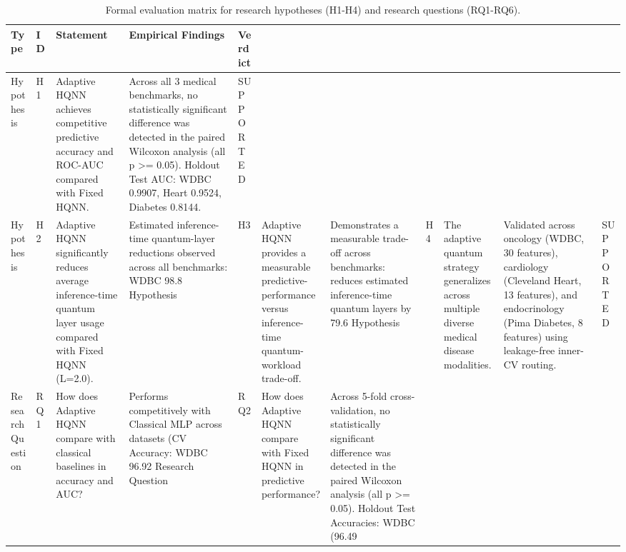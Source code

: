 \begin{table}
\caption{Formal evaluation matrix for research hypotheses (H1-H4) and research questions (RQ1-RQ6).}
\label{tab:hypotheses_summary}
\begin{tabular}{lllll}
\toprule
Type & ID & Statement & Empirical Findings & Verdict \\
\midrule
Hypothesis & H1 & Adaptive HQNN achieves competitive predictive accuracy and ROC-AUC compared with Fixed HQNN. & Across all 3 medical benchmarks, no statistically significant difference was detected in the paired Wilcoxon analysis (all p >= 0.05). Holdout Test AUC: WDBC 0.9907, Heart 0.9524, Diabetes 0.8144. & SUPPORTED \\
Hypothesis & H2 & Adaptive HQNN significantly reduces average inference-time quantum layer usage compared with Fixed HQNN (L=2.0). & Estimated inference-time quantum-layer reductions observed across all benchmarks: WDBC 98.8%
Hypothesis & H3 & Adaptive HQNN provides a measurable predictive-performance versus inference-time quantum-workload trade-off. & Demonstrates a measurable trade-off across benchmarks: reduces estimated inference-time quantum layers by 79.6%
Hypothesis & H4 & The adaptive quantum strategy generalizes across multiple diverse medical disease modalities. & Validated across oncology (WDBC, 30 features), cardiology (Cleveland Heart, 13 features), and endocrinology (Pima Diabetes, 8 features) using leakage-free inner-CV routing. & SUPPORTED \\
Research Question & RQ1 & How does Adaptive HQNN compare with classical baselines in accuracy and AUC? & Performs competitively with Classical MLP across datasets (CV Accuracy: WDBC 96.92%
Research Question & RQ2 & How does Adaptive HQNN compare with Fixed HQNN in predictive performance? & Across 5-fold cross-validation, no statistically significant difference was detected in the paired Wilcoxon analysis (all p >= 0.05). Holdout Test Accuracies: WDBC (96.49%

\end{tabular}
\end{table}

